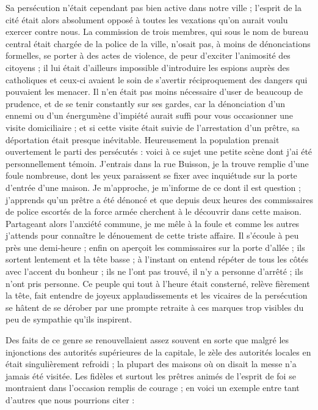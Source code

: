 \documentclass[11pt,a4paper]{report}
\begin{document}
Sa persécution n'était cependant pas bien active dans notre ville ; l'esprit de la cité était alors absolument opposé à toutes les vexations qu'on aurait voulu exercer contre nous. La commission de trois membres, qui sous le nom de bureau central était chargée de la police de la ville, n'osait pas, à moins de dénonciations formelles, se porter à des actes de violence, de peur d'exciter l'animosité des citoyens ; il lui était d'ailleurs impossible d'introduire les espions auprès des catholiques et ceux-ci avaient le soin de s'avertir réciproquement des dangers qui pouvaient les menacer. Il n'en était pas moins nécessaire d'user de beaucoup de prudence, et de se tenir constantly sur ses gardes, car la dénonciation d'un ennemi ou d'un énergumène d'impiété aurait suffi pour vous occasionner une visite domiciliaire ; et si cette visite était suivie de l'arrestation d'un prêtre, sa déportation était presque inévitable. Heureusement la population prenait ouvertement le parti des persécutés : voici à ce sujet une petite scène dont j'ai été personnellement témoin. J'entrais dans la rue Buisson, je la trouve remplie d'une foule nombreuse, dont les yeux paraissent se fixer avec inquiétude sur la porte d'entrée d'une maison. Je m'approche, je m'informe de ce dont il est question ; j'apprends qu'un prêtre a été dénoncé et que depuis deux heures des commissaires de police escortés de la force armée cherchent à le découvrir dans cette maison. Partageant alors l'anxiété commune, je me mêle à la foule et comme les autres j'attends pour connaître le dénouement de cette triste affaire. Il s'écoule à peu près une demi-heure ; enfin on aperçoit les commissaires sur la porte d'allée ; ils sortent lentement et la tête basse ; à l'instant on entend répéter de tous les côtés avec l'accent du bonheur ; ils ne l'ont pas trouvé, il n'y a personne d'arrêté ; ils n'ont pris personne. Ce peuple qui tout à l'heure était consterné, relève fièrement la tête, fait entendre de joyeux applaudissements et les vicaires de la persécution se hâtent de se dérober par une prompte retraite à ces marques trop visibles du peu de sympathie qu'ils inspirent.

Des faits de ce genre se renouvellaient assez souvent en sorte que malgré les injonctions des autorités supérieures de la capitale, le zèle des autorités locales en était singulièrement refroidi ; la plupart des maisons où on disait la messe n'a jamais été visitée. Les fidèles et surtout les prêtres animés de l'esprit de foi se montraient dans l'occasion remplis de courage ; en voici un exemple entre tant d'autres que nous pourrions citer :
\end{document}
